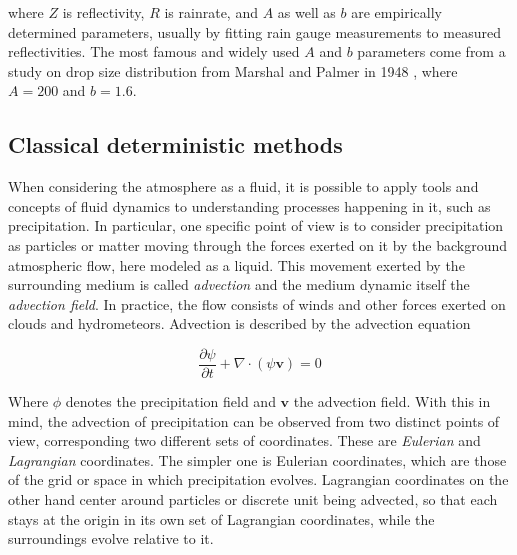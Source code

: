 where $Z$ is reflectivity, $R$ is rainrate, and $A$ as well as $b$ are empirically determined parameters, usually by fitting rain gauge measurements to measured reflectivities. The most famous and widely used $A$ and $b$ parameters come from a study on drop size distribution from Marshal and Palmer in 1948 \cite{marshall1948size}, where $A=200$ and $b=1.6$.


\subsection{Classical deterministic methods}
\label{section:classic_nowcast}


When considering the atmosphere as a fluid, it is possible to apply tools and concepts of fluid dynamics to understanding processes happening in it, such as precipitation. In particular, one specific point of view is to consider precipitation as particles or matter moving through the forces exerted on it by the background atmospheric flow, here modeled as a liquid. This movement exerted by the surrounding medium is called \textit{advection} and the medium dynamic itself the \textit{advection field}. In practice, the flow consists of winds and other forces exerted on clouds and hydrometeors. Advection is described by the advection equation

\begin{equation}
	\label{eq:adv}
	\frac{\partial \psi}{\partial t} + \nabla \cdot (\psi \pmb{v}) = 0
\end{equation}

Where $\phi$ denotes the precipitation field and $\pmb{v}$ the advection field. With this in mind, the advection of precipitation can be observed from two distinct points of view, corresponding two different sets of coordinates. These are \textit{Eulerian} and \textit{Lagrangian} coordinates. The simpler one is Eulerian coordinates, which are those of the grid or space in which precipitation evolves. Lagrangian coordinates on the other hand center around particles or discrete unit being advected, so that each stays at the origin in its own set of Lagrangian coordinates, while the surroundings evolve relative to it. 

